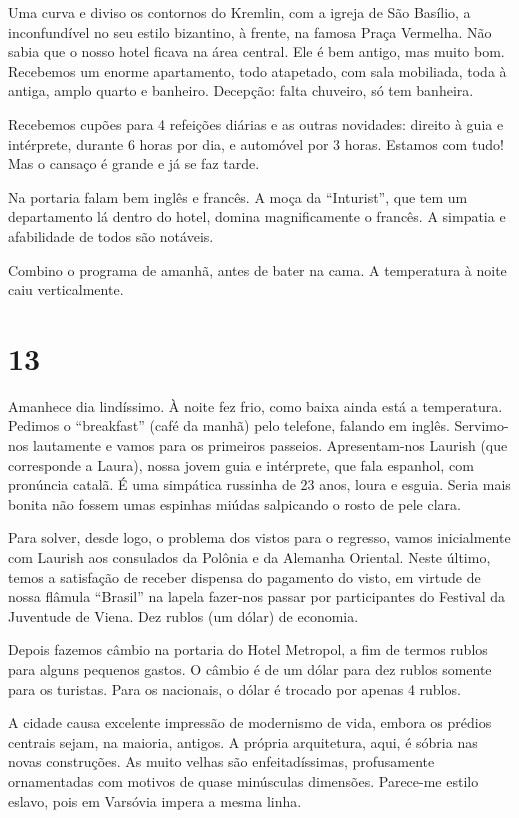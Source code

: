 Uma curva e diviso os contornos do Kremlin, com a igreja de São Basílio, a inconfundível no seu estilo bizantino, à frente, na famosa Praça Vermelha. Não sabia que o nosso hotel ficava na área central. Ele é bem antigo, mas muito bom. Recebemos um enorme apartamento, todo atapetado, com sala mobiliada, toda à antiga, amplo quarto e banheiro. Decepção: falta chuveiro, só tem banheira.

Recebemos cupões para 4 refeições diárias e as outras novidades: direito à guia e intérprete, durante 6 horas por dia, e automóvel por 3 horas. Estamos com tudo! Mas o cansaço é grande e já se faz tarde.

Na portaria falam bem inglês e francês. A moça da “Inturist”, que tem um departamento lá dentro do hotel, domina magnificamente o francês. A simpatia e afabilidade de todos são notáveis.

Combino o programa de amanhã, antes de bater na cama. A temperatura à noite caiu verticalmente.

\section*{13 \adfflatleafright {}}
Amanhece dia lindíssimo. À noite fez frio, como baixa ainda está a temperatura. Pedimos o “breakfast” (café da manhã) pelo telefone, falando em inglês. Servimo-nos lautamente e vamos para os primeiros passeios. Apresentam-nos Laurish (que corresponde a Laura), nossa jovem guia e intérprete, que fala espanhol, com pronúncia catalã. É uma simpática russinha de 23 anos, loura e esguia. Seria mais bonita não fossem umas espinhas miúdas salpicando o rosto de pele clara.

Para solver, desde logo, o problema dos vistos para o regresso, vamos inicialmente com Laurish aos consulados da Polônia e da Alemanha Oriental. Neste último, temos a satisfação de receber dispensa do pagamento do visto, em virtude de nossa flâmula “Brasil” na lapela fazer-nos passar por participantes do Festival da Juventude de Viena. Dez rublos (um dólar) de economia.

Depois fazemos câmbio na portaria do Hotel Metropol, a fim de termos rublos para alguns pequenos gastos. O câmbio é de um dólar para dez rublos somente para os turistas. Para os nacionais, o dólar é trocado por apenas 4 rublos.

A cidade causa excelente impressão de modernismo de vida, embora os prédios centrais sejam, na maioria, antigos. A própria arquitetura, aqui, é sóbria nas novas construções. As muito velhas são enfeitadíssimas, profusamente ornamentadas com motivos de quase minúsculas dimensões. Parece-me estilo eslavo, pois em Varsóvia impera a mesma linha.

